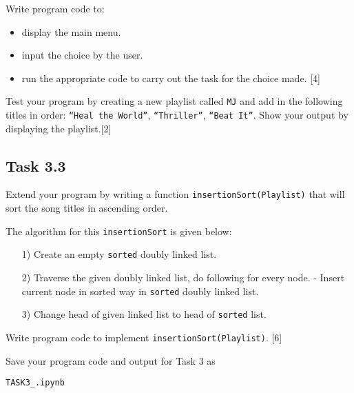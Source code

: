 Write program code to: 
\begin{itemize}
\item display the main menu. 
\item input the choice by the user. 
\item run the appropriate code to carry out the task for the choice made.
\hfill{}{[}4{]}
\end{itemize}
Test your program by creating a new playlist called \texttt{MJ} and
add in the following titles in order: \texttt{\textquotedblleft Heal
the World\textquotedblright }, \texttt{\textquotedblleft Thriller\textquotedblright },
\texttt{\textquotedblleft Beat It\textquotedblright }. Show your output
by displaying the playlist.\hfill{}{[}2{]}

\subsection*{Task 3.3 }

Extend your program by writing a function \texttt{insertionSort(Playlist)}
that will sort the song titles in ascending order. 

The algorithm for this \texttt{insertionSort} is given below: 
\begin{enumerate}
\item[1)]  Create an empty \texttt{sorted} doubly linked list. 
\item[2)]  Traverse the given doubly linked list, do following for every node.
- Insert current node in sorted way in \texttt{sorted} doubly linked
list. 
\item[3)]  Change head of given linked list to head of \texttt{sorted} list. 
\end{enumerate}
Write program code to implement \texttt{insertionSort(Playlist)}.
\hfill{}{[}6{]}

Save your program code and output for Task 3 as 

\texttt{TASK3\_<your name>.ipynb}